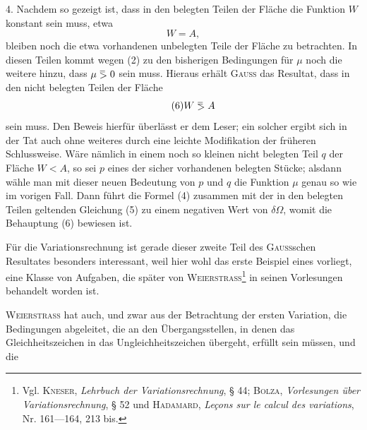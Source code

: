 \clearpage\begingroup\NoSourceHead{}
\renewcommand{\thefootnote}{\arabic{footnote})}\setcounter{footnote}{8}
\newcommand{\BolzaEqualAboveGreater}{\mathrel{\vcenter{\offinterlineskip\hbox{$\scriptstyle=$}\kern-.15ex\hbox{$>$}}}}
\noindent\hspace*{\parindent}4. Nachdem so gezeigt ist, dass in den belegten Teilen der Fläche die
Funktion $W$ konstant sein muss, etwa
\begin{equation*}\tag{5}
W=A,
\end{equation*}
bleiben noch die etwa vorhandenen unbelegten Teile der Fläche zu betrachten.
In diesen Teilen kommt wegen (2) zu den bisherigen Bedingungen für $\mu$ noch
die weitere hinzu, dass $\mu\BolzaEqualAboveGreater0$ sein muss. Hieraus erhält \textsc{Gauss} das Resultat,
dass in den nicht belegten Teilen der Fläche
\begin{equation*}\tag{6}
W\BolzaEqualAboveGreater A
\end{equation*}
sein muss. Den Beweis hierfür überlässt er dem Leser; ein solcher ergibt
sich in der Tat auch ohne weiteres durch eine leichte Modifikation der früheren
Schlussweise. Wäre nämlich in einem noch so kleinen nicht belegten Teil $q$
der Fläche $W<A$, so sei $p$ eines der sicher vorhandenen belegten Stücke;
alsdann wähle man mit dieser neuen Bedeutung von $p$ und $q$ die Funktion $\mu$
genau so wie im vorigen Fall. Dann führt die Formel (4) zusammen mit der
in den belegten Teilen geltenden Gleichung (5) zu einem negativen Wert von
$\delta\Omega$, womit die Behauptung (6) bewiesen ist.
\par\noindent\hspace*{\parindent}Für die Variationsrechnung ist gerade dieser zweite Teil des \textsc{Gauss}schen
Resultates besonders interessant, weil hier wohl das erste Beispiel eines  vorliegt, eine Klasse von Aufgaben, die später von \textsc{Weierstrass}\footnote{Vgl. \textsc{Kneser}, \textit{Lehrbuch der Variationsrechnung}, § 44; \textsc{Bolza}, \textit{Vorlesungen über Variationsrechnung},
§ 52 und \textsc{Hadamard}, \textit{Leçons sur le calcul des variations}, Nr. 161—164, 213 bis.} in seinen Vorlesungen behandelt worden ist.
\par\noindent\hspace*{\parindent}\textsc{Weierstrass} hat auch, und zwar aus der Betrachtung der ersten Variation,
die Bedingungen abgeleitet, die an den Übergangsstellen, in denen das Gleichheitszeichen in das Ungleichheitszeichen übergeht, erfüllt sein müssen, und die
